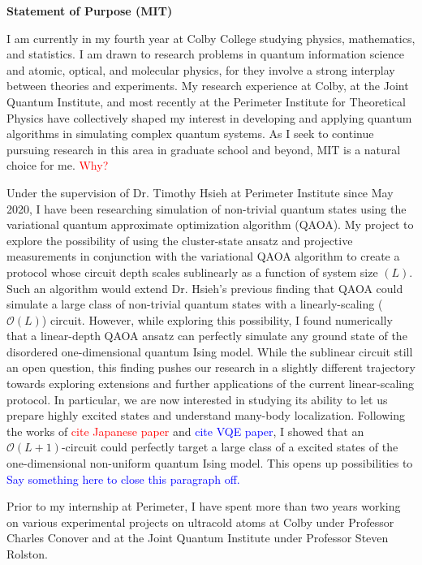\documentclass[12pt]{article}
\begin{document}
	
	
\begin{center}
	\textbf{Statement of Purpose (MIT)}
\end{center}	
I am currently in my fourth year at Colby College studying physics, mathematics, and statistics. I am drawn to research problems in quantum information science and atomic, optical, and molecular physics, for they involve a strong interplay between theories and experiments. My research experience at Colby, at the Joint Quantum Institute, and most recently at the Perimeter Institute for Theoretical Physics have collectively shaped my interest in developing and applying quantum algorithms in simulating complex quantum systems. As I seek to continue pursuing research in this area in graduate school and beyond, MIT is a natural choice for me. \textcolor{red}{Why?}

Under the supervision of Dr. Timothy Hsieh at Perimeter Institute since May 2020, I have been researching simulation of non-trivial quantum states using the variational quantum approximate optimization algorithm (QAOA). My project to explore the possibility of using the cluster-state ansatz and projective measurements in conjunction with the variational QAOA algorithm to create a protocol whose circuit depth scales sublinearly as a function of system size $(L)$. Such an algorithm would extend Dr. Hsieh's previous finding that QAOA could simulate a large class of non-trivial quantum states with a linearly-scaling ($\mathcal{O}(L)$) circuit. However, while exploring this possibility, I found numerically that a linear-depth QAOA ansatz can perfectly simulate any ground state of the disordered one-dimensional quantum Ising model. While the sublinear circuit still an open question, this finding pushes our research in a slightly different trajectory towards exploring extensions and further applications of the current linear-scaling protocol. In particular, we are now interested in studying its ability to let us prepare highly excited states and understand many-body localization. Following the works of \textcolor{red}{cite Japanese paper} and \textcolor{blue}{cite VQE paper}, I showed that an $\mathcal{O}(L+1)$-circuit could perfectly target a large class of a excited states of the one-dimensional non-uniform quantum Ising model. This opens up possibilities to \textcolor{blue}{Say something here to close this paragraph off.}

Prior to my internship at Perimeter, I have spent more than two years working on various experimental projects on ultracold atoms at Colby under Professor Charles Conover and at the Joint Quantum Institute under Professor Steven Rolston. 
\end{document}
